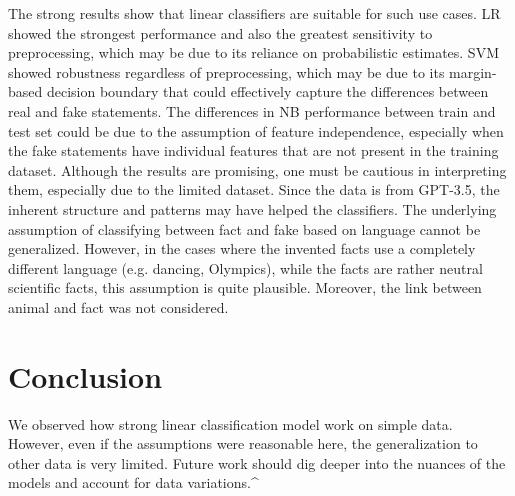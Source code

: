 \documentclass[12pt]{article}
\begin{document}
The strong results show that linear classifiers are suitable for such use cases. LR showed the strongest performance and also the greatest sensitivity to preprocessing, which may be due to its reliance on probabilistic estimates. SVM showed robustness regardless of preprocessing, which may be due to its margin-based decision boundary that could effectively capture the differences between real and fake statements. The differences in NB performance between train and test set could be due to the assumption of feature independence, especially when the fake statements have individual features that are not present in the training dataset. Although the results are promising, one must be cautious in interpreting them, especially due to the limited dataset. Since the data is from GPT-3.5, the inherent structure and patterns may have helped the classifiers. The underlying assumption of classifying between fact and fake based on language cannot be generalized. However, in the cases where the invented facts use a completely different language (e.g. dancing, Olympics), while the facts are rather neutral scientific facts, this assumption is quite plausible. Moreover, the link between animal and fact was not considered.


\section{Conclusion}
We observed how strong linear classification model work on simple data. However, even if the assumptions were reasonable here, the generalization to other data is very limited. Future work should dig deeper into the nuances of the models and account for data variations.^

\end{document}
